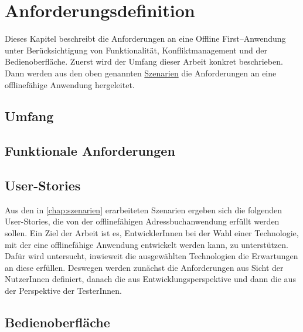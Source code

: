 \chapter{\label{chap:anforderungen}Anforderungsdefinition}
Dieses Kapitel beschreibt die Anforderungen an eine Offline First--Anwendung unter Berücksichtigung von Funktionalität, Konfliktmanagement und der Bedienoberfläche.
Zuerst wird der Umfang dieser Arbeit konkret beschrieben. Dann werden aus den oben genannten \hyperref[chap:szenarien]{Szenarien} die Anforderungen an eine offlinefähige Anwendung hergeleitet.
%
%
\section{Umfang}

%
%
\section{\label{chap:funktionaleanforderungen}Funktionale Anforderungen}

%
%
\section{User-Stories}
Aus den in \autoref{chap:szenarien} erarbeiteten Szenarien ergeben sich die folgenden User-Stories, die von der offlinefähigen Adressbuchanwendung erfüllt werden sollen.
Ein Ziel der Arbeit ist es, EntwicklerInnen bei der Wahl einer Technologie, mit der eine offlinefähige Anwendung entwickelt werden kann, zu unterstützen. Dafür wird untersucht, inwieweit die ausgewählten Technologien die Erwartungen an diese erfüllen.
Deswegen werden zunächst die Anforderungen aus Sicht der NutzerInnen definiert, danach die aus Entwicklungsperspektive und dann die aus der Perspektive der TesterInnen.



%
%
\section{Bedienoberfläche}
